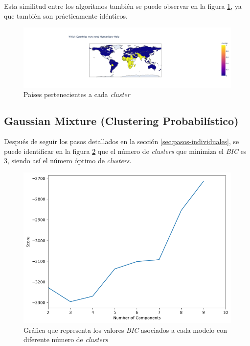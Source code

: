 \documentclass{article}
\begin{document}
\noindent Esta similitud entre los algoritmos también se puede observar en la figura \ref{fig:agglomerative-map}, ya que también son prácticamente idénticos.

\begin{figure}[H]
  \centering
  \includegraphics[width=\linewidth]{../images/agglomerative/map.png}
  \caption{Países pertenecientes a cada \textit{cluster}}
  \label{fig:agglomerative-map}
\end{figure}

\subsection{Gaussian Mixture (Clustering Probabilístico)}
\noindent Después de seguir los pasos detallados en la sección \ref{sec:pasos-individuales}, se puede identificar en la figura \ref{fig:bic} que el número de \textit{clusters} que minimiza el \textit{BIC} es 3,
siendo así el número óptimo de \textit{clusters}.

\begin{figure}[H]
  \centering
  \includegraphics[width=0.35\linewidth]{../images/gaussian/bic.png}
  \caption{Gráfica que representa los valores \textit{BIC} asociados a cada modelo con diferente número de \textit{clusters}}
  \label{fig:bic}
\end{figure}
\end{document}
